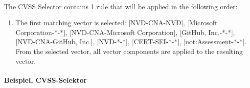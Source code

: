 \

\noindent The CVSS Selector contains 1 rule that will be applied in the following order:
\begin{enumerate}[noitemsep]
    \item The first matching vector is selected: [NVD-CNA-NVD], [Microsoft Corporation-*-*], [NVD-CNA-Microsoft Corporation], [GitHub, Inc.-*-*], [NVD-CNA-GitHub, Inc.], [NVD-*-*], [CERT-SEI-*-*], [not:Assessment-*-*]. From the selected vector, all vector components are applied to the resulting vector.
\end{enumerate}

\paragraph{Beispiel, CVSS-Selektor } \label{par:projektbericht-loesungsweg-cvss-selection-example-selector-context}

\

